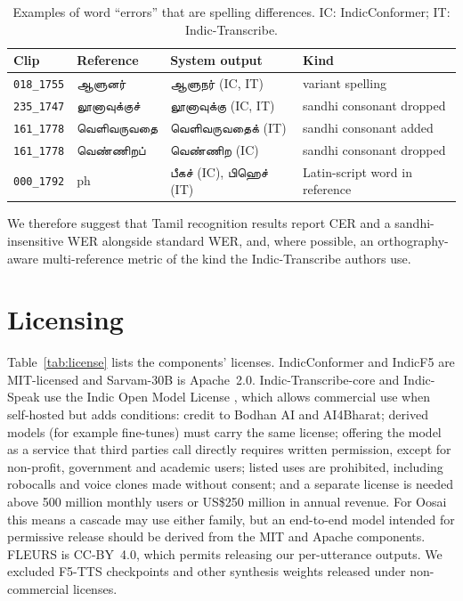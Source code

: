 \documentclass[11pt]{article}
\newcommand{\ta}[1]{{\tamilfont #1}}
\begin{document}
\begin{table}[t]
\centering\small
\caption{Examples of word ``errors'' that are spelling differences. IC: IndicConformer;
IT: Indic-Transcribe.}
\label{tab:examples}
\begin{tabular}{llll}
\toprule
Clip & Reference & System output & Kind \\
\midrule
\texttt{018\_1755} & \ta{ஆளுனர்} & \ta{ஆளுநர்} (IC, IT) & variant spelling \\
\texttt{235\_1747} & \ta{லூனாவுக்குச்} & \ta{லூனாவுக்கு} (IC, IT) & sandhi consonant dropped \\
\texttt{161\_1778} & \ta{வெளிவருவதை} & \ta{வெளிவருவதைக்} (IT) & sandhi consonant added \\
\texttt{161\_1778} & \ta{வெண்ணிறப்} & \ta{வெண்ணிற} (IC) & sandhi consonant dropped \\
\texttt{000\_1792} & ph & \ta{பீகச்} (IC), \ta{பிஹெச்} (IT) & Latin-script word in reference \\
\bottomrule
\end{tabular}
\end{table}

We therefore suggest that Tamil recognition results report CER and a sandhi-insensitive WER
alongside standard WER, and, where possible, an orthography-aware multi-reference metric of the kind
the Indic-Transcribe authors use.

\section{Licensing}
\label{sec:license}

Table~\ref{tab:license} lists the components' licenses. IndicConformer and IndicF5 are MIT-licensed
and Sarvam-30B is Apache~2.0. Indic-Transcribe-core and Indic-Speak use the Indic Open Model License
\citep{bodhan2026license}, which allows commercial use when self-hosted but adds conditions: credit
to Bodhan AI and AI4Bharat; derived models (for example fine-tunes) must carry the same license;
offering the model as a service that third parties call directly requires written permission,
except for non-profit, government and academic users; listed uses are prohibited, including
robocalls and voice clones made without consent; and a separate license is needed above 500 million
monthly users or US\$250 million in annual revenue. For Oosai this means a cascade may use either
family, but an end-to-end model intended for permissive release should be derived from the MIT and
Apache components. FLEURS is CC-BY~4.0, which permits releasing our per-utterance outputs. We
excluded F5-TTS checkpoints and other synthesis weights released under non-commercial licenses.
\end{document}
